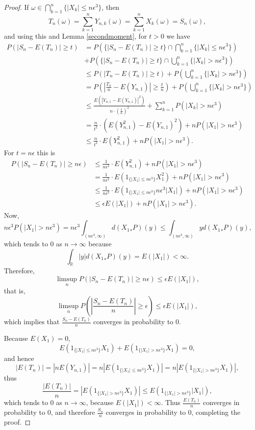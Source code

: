 \documentclass{article}
\theoremstyle{definition}
\begin{document}
\begin{proof}
If $\omega \in \bigcap_{k=1}^n \{|X_k| \leq n \epsilon^3\}$, then
\[
T_n(\omega) = \sum_{k=1}^n Y_{n,k}(\omega) = \sum_{k=1}^n X_k(\omega) = S_n(\omega),
\]
and using this and Lemma \ref{secondmoment},
for $t>0$ we have
\begin{align*}
P(|S_n-E(T_n)| \geq t)&=P\left( \{|S_n - E(T_n)| \geq t\} \cap \bigcap_{k=1}^n \{|X_k| \leq n \epsilon^3\} \right)\\
&+P\left( \{|S_n - E(T_n)| \geq t\} \cap \bigcup_{k=1}^n \{|X_k| > n \epsilon^3\} \right)\\
&\leq P(|T_n-E(T_n)| \geq t)
+P\left(  \bigcup_{k=1}^n \{|X_k| > n \epsilon^3\} \right)\\
&=P\left(\left|\frac{T_n}{n} -  E(Y_{n,1})\right| \geq \frac{t}{n}\right) + P\left(  \bigcup_{k=1}^n \{|X_k| > n \epsilon^3\} \right)\\
&\leq \frac{E(|Y_{n,1}-E(Y_{n,1})|^2)}{n \cdot \left(\frac{t}{n}\right)^2}
+\sum_{k=1}^n P(|X_k| > n\epsilon^3)\\
&=\frac{n}{t^2} \cdot (E(Y_{n,1}^2)-E(Y_{n,1})^2)+ nP(|X_1|>n\epsilon^3)\\
&\leq \frac{n}{t^2}  \cdot E(Y_{n,1}^2) + nP(|X_1|>n\epsilon^3).
\end{align*}
For $t=n\epsilon$ this is
\begin{align*}
P(|S_n-E(T_n)| \geq n\epsilon)&\leq \frac{1}{n \epsilon^2} \cdot E(Y_{n,1}^2)
+nP(|X_1|>n\epsilon^3)\\
&=\frac{1}{n \epsilon^2} \cdot E(1_{\{|X_1| \leq n \epsilon^3\}} X_1^2)+ nP(|X_1|>n\epsilon^3)\\
&\leq \frac{1}{n\epsilon^2} \cdot E(1_{\{|X_1| \leq n \epsilon^3\}} n\epsilon^3 |X_1|) + nP(|X_1|>n\epsilon^3)\\
&\leq \epsilon E(|X_1|) + nP(|X_1|>n\epsilon^3).
\end{align*}
Now, 
\[
n\epsilon^3 P(|X_1|>n\epsilon^3)
=n\epsilon^3 \int_{(n\epsilon^3,\infty)} d({X_1}_*P)(y)
\leq   \int_{(n\epsilon^3,\infty)} y d({X_1}_*P)(y),
\]
which tends to $0$ as $n \to \infty$ because
\[
\int_{\mathbb{R}} |y| d({X_1}_*P)(y) = E(|X_1|) < \infty.
\]
Therefore,
\[
\limsup_n P(|S_n-E(T_n)| \geq n\epsilon) \leq \epsilon E(|X_1|),
\]
that is, 
\[
\limsup_n P\left(\left|\frac{S_n-E(T_n)}{n} \right| \geq \epsilon\right) \leq \epsilon E(|X_1|),
\]
which implies that $\frac{S_n-E(T_n)}{n}$ converges in probability to $0$. 

Because $E(X_1)=0$,
\[
E(1_{\{|X_1| \leq n \epsilon^3\}} X_1) + E(1_{\{|X_1| > n \epsilon^3\}} X_1) = 0,
\]
and hence
\[
|E(T_n)|=|nE(Y_{n,1})|
=n|E(1_{\{|X_1| \leq n \epsilon^3\}} X_1)|
= n | E(1_{\{|X_1| > n\epsilon^3\}} X_1)|,
\]
thus
\[
\frac{|E(T_n)|}{n} = | E(1_{\{|X_1| > n\epsilon^3\}} X_1)| 
\leq E(1_{\{|X_1|>n\epsilon^3\}} |X_1|),
\]
which tends to $0$ as $n \to \infty$, because $E(|X_1|)<\infty$. 
Thus $\frac{E(T_n)}{n}$ converges in probability to $0$, and therefore
$\frac{S_n}{n}$ converges in probability to $0$, completing the proof.
\end{proof}
\end{document}
